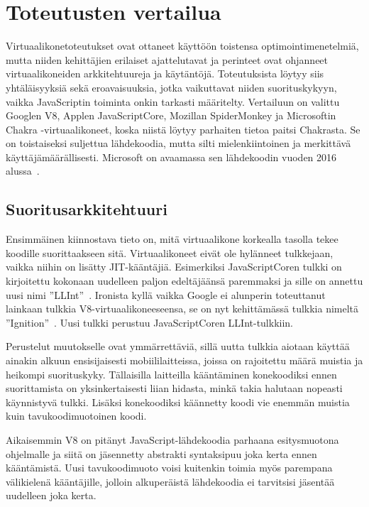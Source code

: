 \pagebreak
\section{Toteutusten vertailua}

Virtuaalikonetoteutukset ovat ottaneet käyttöön toistensa optimointimenetelmiä, mutta niiden kehittäjien erilaiset ajattelutavat ja perinteet ovat ohjanneet virtuaalikoneiden arkkitehtuureja ja käytäntöjä. Toteutuksista löytyy siis yhtäläisyyksiä sekä eroavaisuuksia, jotka vaikuttavat niiden suorituskykyyn, vaikka JavaScriptin toiminta onkin tarkasti määritelty. Vertailuun on valittu Googlen V8, Applen JavaScriptCore, Mozillan SpiderMonkey ja Microsoftin Chakra -virtuaalikoneet, koska niistä löytyy parhaiten tietoa paitsi Chakrasta. Se on toistaiseksi suljettua lähdekoodia, mutta silti mielenkiintoinen ja merkittävä käyttäjämäärällisesti. Microsoft on avaamassa sen lähdekoodin vuoden 2016 alussa~\cite{chakraopen}.

\subsection{Suoritusarkkitehtuuri}

Ensimmäinen kiinnostava tieto on, mitä virtuaalikone korkealla tasolla tekee koodille suorittaakseen sitä. Virtuaalikoneet eivät ole hylänneet tulkkejaan, vaikka niihin on lisätty JIT-kääntäjiä. Esimerkiksi JavaScriptCoren tulkki on kirjoitettu kokonaan uudelleen paljon edeltäjäänsä paremmaksi ja sille on annettu uusi nimi ''LLInt''~\cite{llint}. Ironista kyllä vaikka Google ei alunperin toteuttanut lainkaan tulkkia V8-virtuaalikoneeseensa, se on nyt kehittämässä tulkkia nimeltä ''Ignition''~\cite{v8ignition}. Uusi tulkki perustuu JavaScriptCoren LLInt-tulkkiin.

Perustelut muutokselle ovat ymmärrettäviä, sillä uutta tulkkia aiotaan käyttää ainakin alkuun ensisijaisesti mobiililaitteissa, joissa on rajoitettu määrä muistia ja heikompi suorituskyky. Tällaisilla laitteilla kääntäminen konekoodiksi ennen suorittamista on yksinkertaisesti liian hidasta, minkä takia halutaan nopeasti käynnistyvä tulkki. Lisäksi konekoodiksi käännetty koodi vie enemmän muistia kuin tavukoodimuotoinen koodi.

Aikaisemmin V8 on pitänyt JavaScript-lähdekoodia parhaana esitysmuotona ohjelmalle ja siitä on jäsennetty abstrakti syntaksipuu joka kerta ennen kääntämistä. Uusi tavukoodimuoto voisi kuitenkin toimia myös parempana välikielenä kääntäjille, jolloin alkuperäistä lähdekoodia ei tarvitsisi jäsentää uudelleen joka kerta.

